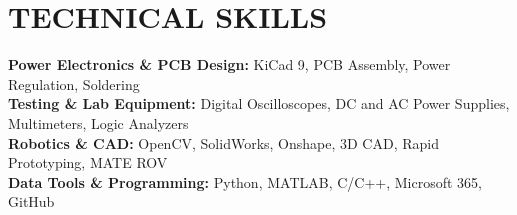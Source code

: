 \documentclass[letterpaper,11pt]{article}
\begin{document}
\section{TECHNICAL SKILLS}
 \begin{itemize}[leftmargin=0.15in, label={}]
    \small{\item{
     \textbf{Power Electronics \& PCB Design:} KiCad 9, PCB Assembly, Power Regulation, Soldering \\
     \textbf{Testing \& Lab Equipment:} Digital Oscilloscopes, DC and AC Power Supplies, Multimeters, Logic Analyzers \\
     \textbf{Robotics \& CAD:} OpenCV, SolidWorks, Onshape, 3D CAD, Rapid Prototyping, MATE ROV \\
     \textbf{Data Tools \& Programming:} Python, MATLAB, C/C++, Microsoft 365, GitHub
    }}
 \end{itemize}


\end{document}
